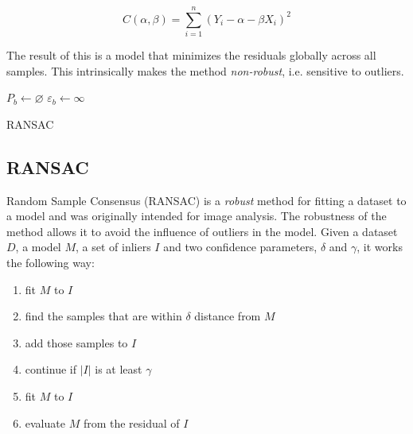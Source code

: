 \documentclass[a4paper]{report}
\begin{document}
\begin{equation}
    C(\alpha, \beta) = \sum_{i=1}^n(Y_i - \alpha - \beta X_i)^2
\end{equation}

The result of this is a model that minimizes the residuals globally across all
samples. This intrinsically makes the method \emph{non-robust}, i.e. sensitive
to outliers.

{
    \fontsize{10}{12}
    \selectfont
    \begin{algorithm}[t]
        \DontPrintSemicolon
        \BlankLine
        \BlankLine
        $P_b \gets \varnothing$\;
        $\varepsilon_b \gets \infty$\;
        \BlankLine
        \caption{RANSAC}
        \label{alg:ransac}
    \end{algorithm}
}

\subsection{RANSAC}
Random Sample Consensus (RANSAC) \citep{fischler81} is a \emph{robust} method
for fitting a dataset to a model and was originally intended for image
analysis. The robustness of the method allows it to avoid the influence of
outliers in the model. Given a dataset $D$, a model $M$, a set of inliers $I$
and two confidence parameters, $\delta$ and $\gamma$, it works the following
way:

\begin{enumerate}
    \item fit $M$ to $I$
    \item find the samples that are within $\delta$ distance from $M$
    \item add those samples to $I$
    \item continue if $|I|$ is at least $\gamma$
    \item fit $M$ to $I$
    \item evaluate $M$ from the residual of $I$
\end{enumerate}
\end{document}
